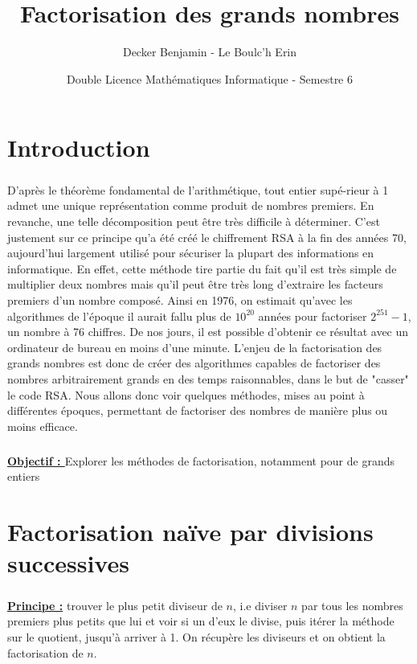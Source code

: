 \documentclass[11pt,a4paper]{article}
\begin{document}
	
	\title{Factorisation des grands nombres} 
	\author{Decker Benjamin - Le Boulc'h Erin}
	\date{Double Licence Mathématiques Informatique - Semestre 6}
	\maketitle
	\newpage
	
	\renewcommand*\contentsname{Sommaire}
	\tableofcontents
	
	\section{\LARGE{Introduction}}
	\subparagraph{}
	D'après le théorème fondamental de l'arithmétique, tout entier supé-rieur à 1 admet une unique représentation comme produit de nombres premiers. En revanche, une telle décomposition peut être très difficile à déterminer. C'est justement sur ce principe qu'a été créé le chiffrement RSA à la fin des années 70, aujourd'hui largement utilisé pour sécuriser la plupart des informations en informatique. En effet, cette méthode tire partie du fait qu'il est très simple de multiplier deux nombres mais qu'il peut être très long d'extraire les facteurs premiers d'un nombre composé. Ainsi en 1976, on estimait qu'avec les algorithmes de l'époque il aurait fallu plus de $10^{20}$ années pour factoriser $2^{251} - 1$, un nombre à 76 chiffres. De nos jours, il est possible d'obtenir ce résultat avec un ordinateur de bureau en moins d'une minute. L'enjeu de la factorisation des grands nombres est donc de créer des algorithmes capables de factoriser des nombres arbitrairement grands en des temps raisonnables, dans le but de "casser" le code RSA. Nous allons donc voir quelques méthodes, mises au point à différentes époques, permettant de factoriser des nombres de manière plus ou moins efficace.
	\subparagraph{}
	\textbf{\underline{Objectif : }}Explorer les méthodes de factorisation, notamment pour de grands entiers
	
	\section{\LARGE{Factorisation naïve par divisions successives}}
	\subparagraph{}
	\textbf{\underline{Principe :}} trouver le plus petit diviseur de  $n$, i.e diviser  $n$ par tous les nombres premiers plus petits que lui et voir si un d’eux le divise, puis itérer la méthode sur le quotient, jusqu'à arriver à 1. On récupère les diviseurs et on obtient la factorisation de $n$.
	
\end{document}
